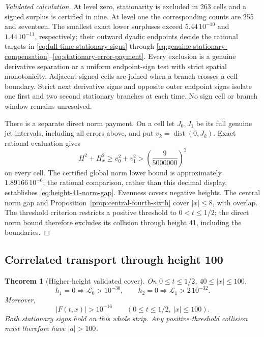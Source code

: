 \documentclass[11pt]{article}
\numberwithin{equation}{section}
\newtheorem{theorem}{Theorem}[section]
\theoremstyle{definition}
\theoremstyle{remark}
\newcommand{\Lag}{\mathscr L}
\begin{document}
\begin{proof}[Validated calculation]
At level zero, stationarity is excluded in 263 cells and a signed
surplus is certified in nine. At level one the corresponding counts
are 255 and seventeen. The smallest exact lower surpluses exceed
\(5.44\,10^{-10}\) and \(1.44\,10^{-11}\), respectively;
their outward dyadic endpoints decide the rational targets in
\eqref{eq:full-time-stationary-signs} through
\eqref{eq:genuine-stationary-compensation}--\eqref{eq:stationary-error-payment}.
Every exclusion is a genuine derivative separation or a uniform
endpoint-sign test with strict spatial monotonicity. Adjacent signed
cells are joined when a branch crosses a cell boundary. Strict next
derivative signs and opposite outer endpoint signs isolate one first
and two second stationary branches at each time. No sign cell or
branch window remains unresolved.

There is a separate direct norm payment. On a cell let \(J_0,J_1\)
be its full genuine jet intervals, including all errors above, and put
\(v_k=\operatorname{dist}(0,J_k)\). Exact rational evaluation gives
\[
 H^2+H_x^2\ge v_0^2+v_1^2>\left(\frac9{5000000}\right)^2
\]
on every cell. The certified global norm lower bound is approximately
\(1.89166\,10^{-6}\); the rational comparison, rather than this
decimal display, establishes \eqref{eq:height-41-norm-gap}.
Evenness covers negative heights. The central norm gap and
Proposition~\ref{prop:central-fourth-sixth} cover \(|x|\le8\), with
overlap. The threshold criterion restricts a positive threshold to
\(0<t\le1/2\); the direct norm bound therefore excludes its collision
through height 41, including the boundaries.
\end{proof}

\subsection{Correlated transport through height 100}
\label{sec:height-100-certificate}

\begin{theorem}[Higher-height validated cover]
\label{thm:height-100-certificate}
On \(0\le t\le1/2\), \(40\le|x|\le100\),
\[
 h_1=0\Longrightarrow\Lag_0>10^{-30},\qquad
 h_2=0\Longrightarrow\Lag_1>2\,10^{-32}.
\]
Moreover,
\begin{equation}
 |F(t,x)|>10^{-16}\qquad(0\le t\le1/2,\ |x|\le100).
 \label{eq:height-100-norm-gap}
\end{equation}
Both stationary signs hold on this whole strip. Any positive threshold
collision must therefore have \(|a|>100\).
\end{theorem}
\end{document}
